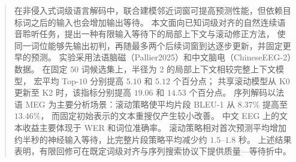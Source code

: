 
\renewcommand{\abstractname}{摘要}
\begin{abstract}
在非侵入式词级语言解码中，联合建模邻近词窗可提高预测性能，但依赖目标词之后的输入也会增加输出等待。
本文面向已知词级对齐的自然连续语音聆听任务，提出一种有限输入等待下的局部上下文与滚动修正方法，
使同一词位能够先输出初判，再随最多两个后续词窗到达逐步更新，并固定更早的预测。
实验采用法语脑磁（Pallier2025）和中文脑电（ChineseEEG-2）数据。
在固定 $50$ 词候选集上，半径为 $2$ 的局部上下文相较完整上下文模型，
宏平均 Top-$10$ 分别提高 $5.10$ 和 $5.12$ 个百分点；
共享滚动模型从 K0 更新至 K2 时，该指标分别提高 $19.06$ 和 $14.53$ 个百分点。
序列解码以法语 MEG 为主要分析场景：滚动策略使平均片段 BLEU-1 从 $8.37\%$ 提高至 $13.46\%$，
而固定初始表示的文本重搜仅产生较小改善。
中文 EEG 上的文本收益主要体现于 WER 和词位准确率。
滚动策略相对首次预测平均增加约半秒的神经输入等待，比完整片段策略平均减少约 $1.5$--$1.8$ 秒。
上述结果表明，有限回修可在既定词级对齐与序列搜索协议下提供质量—等待折中。
\end{abstract}
